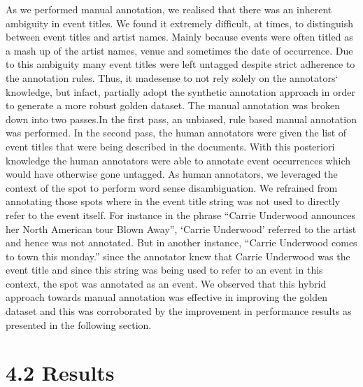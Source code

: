 \documentclass[a4paper,11pt]{report}
\begin{document}
As we performed manual annotation, we realised that there was an inherent ambiguity in event titles. We found it extremely difficult, at times, to distinguish between event titles and artist names. Mainly because events were often titled as a mash up of the artist names, venue and sometimes the date of occurrence. Due to this ambiguity many event titles were left untagged despite strict adherence to the annotation rules. Thus, it madesense to not rely solely on the annotators` knowledge, but infact, partially adopt the synthetic annotation approach in order to generate a more robust golden dataset. The manual annotation was broken down into two passes.In the first pass, an unbiased, rule based manual annotation was performed. In the second pass, the human annotators were given the list of event titles that were being described in the documents. With this posteriori knowledge the human annotators were able to annotate event occurrences which would have otherwise gone untagged. As human annotators, we leveraged the context of the spot to perform word sense disambiguation. We refrained from annotating those spots where in the event title string was not used to directly refer to the event itself. For instance in the phrase ``Carrie Underwood announces her North American tour Blown Away'', `Carrie Underwood' referred to the artist and hence was not annotated. But in another instance, ``Carrie Underwood comes to town this monday.'' since the annotator knew that Carrie Underwood was the event title and since this string was being used to refer to an event in this context, the spot was annotated as an event. We observed that this hybrid approach towards manual annotation was effective in improving the golden dataset and this was corroborated by the improvement in performance results as presented in the following section.

\section*{4.2 Results}
\end{document}
